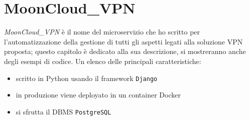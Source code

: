 \chapter{MoonCloud\_VPN}\label{ch:microservice}
\textit{MoonCloud\_VPN} è il nome del microservizio
che ho scritto per l'automatizzazione della gestione di tutti gli aspetti legati
alla soluzione VPN proposta; questo capitolo è dedicato alla sua descrizione, si
mostreranno anche degli esempi di codice.
Un elenco delle principali caratteristiche:
\begin{itemize}
  \item scritto in Python usando il framework \texttt{Django}
  \item in produzione viene deployato in un container Docker
  \item si sfrutta il DBMS \texttt{PostgreSQL}
\end{itemize}







